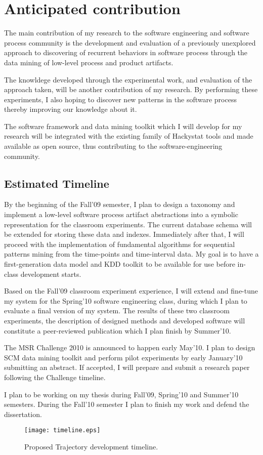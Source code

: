 \chapter{Anticipated contribution} \label{contribution}
The main contribution of my research to the software engineering and software process community is the development and evaluation of a previously unexplored approach to discovering of recurrent behaviors in software process through the data mining of low-level process and product artifacts.

The knowldege developed through the experimental work, and evaluation of the approach taken, will be another contribution of my research. By performing these experiments, I also hoping to discover new patterns in the software process thereby improving our knowledge about it.

The software framework and data mining toolkit which I will develop for my research will be integrated with the existing family of Hackystat tools and made available as open source, thus contributing to the software-engineering community.

\section{Estimated Timeline}
By the beginning of the Fall'09 semester, I plan to design a taxonomy and implement a low-level software process artifact abstractions into a symbolic representation for the classroom experiments. The current database schema will be extended for storing these data and indexes. Immediately after that, I will proceed with the implementation of fundamental algorithms for sequential patterns mining from the time-points and time-interval data. My goal is to have a first-generation data model and KDD toolkit to be available for use before in-class development starts. 

Based on the Fall'09 classroom experiment experience, I will extend and fine-tune my system for the Spring'10 software engineering class, during which I plan to evaluate a final version of my system. The results of these two classroom experiments, the description of designed methods and developed software will constitute a peer-reviewed publication which I plan finish by Summer'10.

The MSR Challenge 2010 is announced to happen early May'10. I plan to design SCM data mining toolkit and perform pilot experiments by early January'10 submitting an abstract. If accepted, I will prepare and submit a research paper following the Challenge timeline.

I plan to be working on my thesis during Fall'09, Spring'10 and Summer'10 semesters. During the Fall'10 semester I plan to finish my work and defend the dissertation.

\begin{figure}[tbp]
   \centering
   \texttt{[image: timeline.eps]}
   \caption{Proposed Trajectory development timeline.}
   \label{fig:timeline}
\end{figure}
